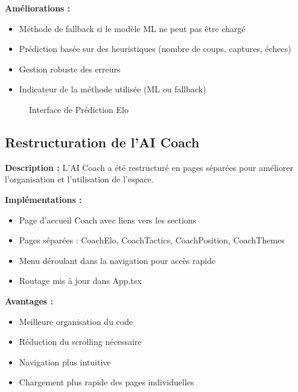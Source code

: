 \documentclass[a4paper,12pt]{article}
\begin{document}
\textbf{Améliorations :}
\begin{itemize}
    \item Méthode de fallback si le modèle ML ne peut pas être chargé
    \item Prédiction basée sur des heuristiques (nombre de coups, captures, échecs)
    \item Gestion robuste des erreurs
    \item Indicateur de la méthode utilisée (ML ou fallback)
\end{itemize}

\begin{figure}[h]
    \centering
    \caption{Interface de Prédiction Elo}
    \label{fig:elo}
\end{figure}

\subsection{Restructuration de l'AI Coach}

\textbf{Description :}
L'AI Coach a été restructuré en pages séparées pour améliorer l'organisation et l'utilisation de l'espace.

\textbf{Implémentations :}
\begin{itemize}
    \item Page d'accueil Coach avec liens vers les sections
    \item Pages séparées : CoachElo, CoachTactics, CoachPosition, CoachThemes
    \item Menu déroulant dans la navigation pour accès rapide
    \item Routage mis à jour dans App.tsx
\end{itemize}

\textbf{Avantages :}
\begin{itemize}
    \item Meilleure organisation du code
    \item Réduction du scrolling nécessaire
    \item Navigation plus intuitive
    \item Chargement plus rapide des pages individuelles
\end{itemize}
\end{document}
